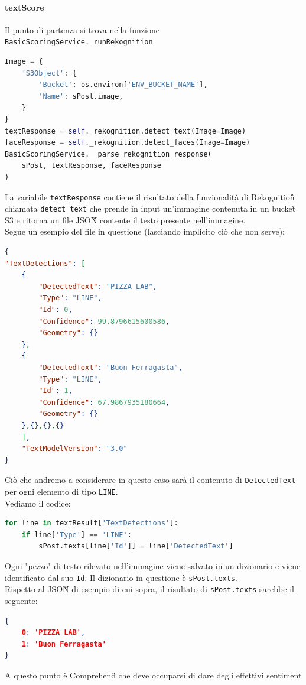 \paragraph{textScore} \aCapo
Il punto di partenza si trova nella funzione \verb+BasicScoringService._runRekognition+:
\begin{lstlisting}[language=Python]
Image = {
    'S3Object': {
        'Bucket': os.environ['ENV_BUCKET_NAME'],
        'Name': sPost.image,
    }
}
textResponse = self._rekognition.detect_text(Image=Image)
faceResponse = self._rekognition.detect_faces(Image=Image)
BasicScoringService.__parse_rekognition_response(
    sPost, textResponse, faceResponse
)
\end{lstlisting}
La variabile \verb+textResponse+ contiene il risultato della funzionalità
di Rekognition\G{} chiamata \verb+detect_text+ che prende in input un'immagine contenuta
in un bucket\G{} S3 e ritorna un file JSON\G{} contente il testo presente nell'immagine.\\
Segue un esempio del file in questione (lasciando implicito ciò che non serve):
\begin{lstlisting}[language=JSON]
{
"TextDetections": [
    {
        "DetectedText": "PIZZA LAB",
        "Type": "LINE",
        "Id": 0,
        "Confidence": 99.8796615600586,
        "Geometry": {}
    },
    {
        "DetectedText": "Buon Ferragasta",
        "Type": "LINE",
        "Id": 1,
        "Confidence": 67.9867935180664,
        "Geometry": {}
    },{},{},{}
    ],
    "TextModelVersion": "3.0"
}        
\end{lstlisting}
Ciò che andremo a considerare in questo caso sarà il contenuto di \verb+DetectedText+
per ogni elemento di tipo \verb+LINE+.\\
Vediamo il codice: 
\begin{lstlisting}[language=Python]
for line in textResult['TextDetections']:
    if line['Type'] == 'LINE':
        sPost.texts[line['Id']] = line['DetectedText']
\end{lstlisting}
Ogni "pezzo" di testo rilevato nell'immagine viene salvato in un dizionario e viene
identificato dal suo \verb+Id+. Il dizionario in
questione è \verb+sPost.texts+.\\
Rispetto al JSON\G{} di esempio di cui sopra, il risultato di \verb+sPost.texts+ sarebbe il seguente:
\begin{lstlisting}[language=JSON]
{
    0: 'PIZZA LAB', 
    1: 'Buon Ferragasta'
}
\end{lstlisting}
A questo punto è Comprehend\G{} che deve occuparsi di dare degli effettivi sentiment
